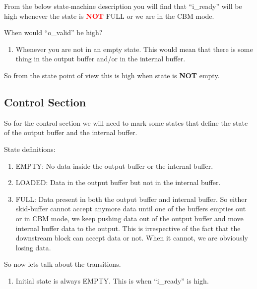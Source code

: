 From the below state-machine description you will find that ``i\_ready'' will be high whenever the state is \textcolor{red}{\textbf{NOT}} FULL or we are in the CBM mode. 

When would ``o\_valid'' be high?
\begin{enumerate}
	\item Whenever you are not in an empty state. This would mean that there is some thing in the output buffer and/or in the internal buffer. 
\end{enumerate}

So from the state point of view this is high when state is \textbf{NOT} empty.


\subsection{Control Section}

So for the control section we will need to mark some states that define the state of the output buffer and the internal buffer. 

State definitions:
\begin{enumerate}
	\item EMPTY: No data inside the output buffer or the internal buffer.
	\item LOADED: Data in the output buffer but not in the internal buffer.
	\item FULL: Data present in both the output buffer and internal buffer. So either skid-buffer cannot accept anymore data until one of the buffers empties out or in CBM mode, we keep pushing data out of the output buffer and move internal buffer data to the output. This is irrespective of the fact that the downstream block can accept data or not. When it cannot, we are obviously losing data. 
\end{enumerate}

So now lets talk about the transitions.

\begin{enumerate}
	\item Initial state is always EMPTY. This is when ``i\_ready'' is high. 
\end{enumerate}

\newpage
 \printbibliography
